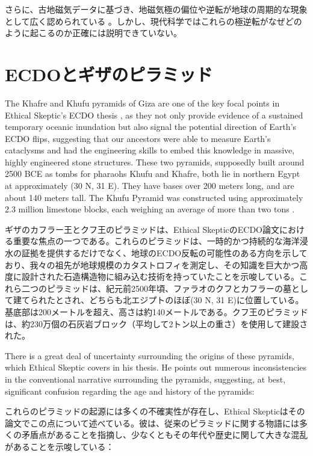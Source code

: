 \documentclass[10pt,twocolumn,letterpaper]{article}
\begin{document}
さらに、古地磁気データに基づき、地磁気極の偏位や逆転が地球の周期的な現象として広く認められている \cite{35,40,41}。しかし、現代科学ではこれらの極逆転がなぜどのように起こるのか正確には説明できていない。

\section{ECDOとギザのピラミッド}

The Khafre and Khufu pyramids of Giza are one of the key focal points in Ethical Skeptic's ECDO thesis \cite{27}, as they not only provide evidence of a sustained temporary oceanic inundation but also signal the potential direction of Earth's ECDO flips, suggesting that our ancestors were able to measure Earth's cataclysms and had the engineering skills to embed this knowledge in massive, highly engineered stone structures. These two pyramids, supposedly built around 2500 BCE as tombs for pharaohs Khufu and Khafre, both lie in northern Egypt at approximately (30 N, 31 E). They have bases over 200 meters long, and are about 140 meters tall. The Khufu Pyramid was constructed using approximately 2.3 million limestone blocks, each weighing an average of more than two tons \cite{24, 25}.

ギザのカフラー王とクフ王のピラミッドは、Ethical SkepticのECDO論文\cite{27}における重要な焦点の一つである。これらのピラミッドは、一時的かつ持続的な海洋浸水の証拠を提供するだけでなく、地球のECDO反転の可能性のある方向を示しており、我々の祖先が地球規模のカタストロフィを測定し、その知識を巨大かつ高度に設計された石造構造物に組み込む技術を持っていたことを示唆している。これら二つのピラミッドは、紀元前2500年頃、ファラオのクフとカフラーの墓として建てられたとされ、どちらも北エジプトのほぼ(30 N, 31 E)に位置している。基底部は200メートルを超え、高さは約140メートルである。クフ王のピラミッドは、約230万個の石灰岩ブロック（平均して2トン以上の重さ）を使用して建設された\cite{24, 25}。

There is a great deal of uncertainty surrounding the origins of these pyramids, which Ethical Skeptic covers in his thesis. He points out numerous inconsistencies in the conventional narrative surrounding the pyramids, suggesting, at best, significant confusion regarding the age and history of the pyramids:

これらのピラミッドの起源には多くの不確実性が存在し、Ethical Skepticはその論文でこの点について述べている。彼は、従来のピラミッドに関する物語には多くの矛盾点があることを指摘し、少なくともその年代や歴史に関して大きな混乱があることを示唆している：
\end{document}
